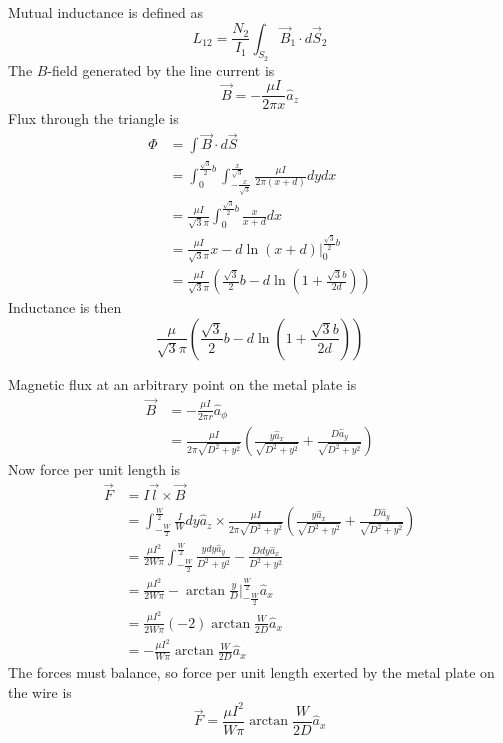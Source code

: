 \documentclass[answers]{exam}
\begin{document}
\begin{questions}
\begin{solution}
    Mutual inductance is defined as
    $$L_{12} = \frac{N_2}{I_1} \int_{S_2} \vec B_1 \cdot d\vec S_2$$
    The $B$-field generated by the line current is
    $$\vec B = -\frac{\mu I}{2\pi x} \hat a_z$$
    Flux through the triangle is
    \begin{align*}
        \Phi &= \int \vec B \cdot d\vec S \\
             &= \int_0^{\frac{\sqrt{3}}{2}b} \int_{-\frac{x}{\sqrt{3}}}^{\frac{x}{\sqrt{3}}} \frac{\mu I}{2\pi (x+d)} dydx \\
             &= \frac{\mu I}{\sqrt{3}\pi} \int_0^{\frac{\sqrt{3}}{2}b} \frac{x}{x+d} dx \\
             &= \frac{\mu I}{\sqrt{3}\pi} x - d\ln(x+d) \Big |_0^{\frac{\sqrt{3}}{2}b} \\
             &= \frac{\mu I}{\sqrt{3}\pi} \left(\frac{\sqrt{3}}{2}b - d\ln\left(1+\frac{\sqrt{3}b}{2d}\right)\right)
    \end{align*}
    Inductance is then
    $$\frac{\mu}{\sqrt{3}\pi} \left(\frac{\sqrt{3}}{2}b - d\ln\left(1+\frac{\sqrt{3}b}{2d}\right)\right)$$
\end{solution}


\begin{solution}
    Magnetic flux at an arbitrary point on the metal plate is
    \begin{align*}
        \vec B &= -\frac{\mu I}{2\pi r} \hat a_\phi \\
               &= \frac{\mu I}{2\pi\sqrt{D^2+y^2}} \left(\frac{y\hat a_x}{\sqrt{D^2+y^2}} + \frac{D\hat a_y}{\sqrt{D^2+y^2}}\right)
    \end{align*}
    Now force per unit length is
    \begin{align*}
        \vec F &= I\vec l \times \vec B \\
               &= \int_{-\frac{W}{2}}^{\frac{W}{2}} \frac{I}{W} dy \hat a_z \times \frac{\mu I}{2\pi\sqrt{D^2+y^2}} \left(\frac{y\hat a_x}{\sqrt{D^2+y^2}} + \frac{D\hat a_y}{\sqrt{D^2+y^2}}\right) \\
               &= \frac{\mu I^2}{2W\pi} \int_{-\frac{W}{2}}^{\frac{W}{2}} \frac{ydy\hat a_y}{D^2+y^2} - \frac{Ddy\hat a_x}{D^2+y^2} \\
               &= \frac{\mu I^2}{2W\pi} -\arctan\frac{y}{D} |_{-\frac{W}{2}}^{\frac{W}{2}} \hat a_x \\
               &= \frac{\mu I^2}{2W\pi} (-2) \arctan\frac{W}{2D} \hat a_x \\
               &= -\frac{\mu I^2}{W\pi} \arctan\frac{W}{2D} \hat a_x
    \end{align*}
    The forces must balance, so force per unit length exerted by the metal plate on the wire is
    $$\vec F = \frac{\mu I^2}{W\pi} \arctan\frac{W}{2D} \hat a_x$$
\end{solution}


\end{questions}
\end{document}
